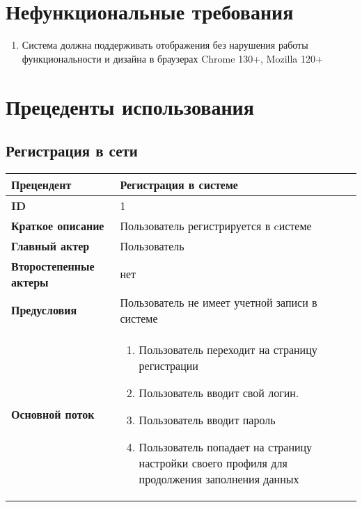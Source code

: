 \documentclass[14pt,a4paper]{extarticle}
\begin{document}
\section{Нефункциональные требования}
\begin{enumerate}[label=\textbf{NFR\arabic*}.]
	\item Система должна поддерживать отображения без нарушения работы функциональности
	      и дизайна в браузерах Chrome 130+, Mozilla 120+
\end{enumerate}

\section{Прецеденты использования}
\subsection{Регистрация в сети}
\begin{tabular}{|l|p{9cm}|}
	\hline
	\textbf{Прецендент}            & Регистрация в системе                                                                             \\
	\hline
	\textbf{ID}                    & 1                                                                                                 \\
	\hline
	\textbf{Краткое описание}      & Пользователь регистрируется в cистеме                                                             \\
	\hline
	\textbf{Главный актер}         & Пользователь                                                                                      \\
	\hline
	\textbf{Второстепенные актеры} & нет                                                                                               \\
	\hline
	\textbf{Предусловия}           & Пользователь не имеет учетной записи в системе                                                    \\
	\hline
	\textbf{Основной поток}        & \begin{enumerate}
		                                 \item Пользователь переходит на страницу регистрации
		                                 \item Пользователь вводит свой логин.
		                                 \item Пользователь вводит пароль
		                                 \item Пользователь попадает на страницу настройки своего профиля для продолжения заполнения данных
	                                 \end{enumerate} \\
	\hline
\end{tabular}
\end{document}
